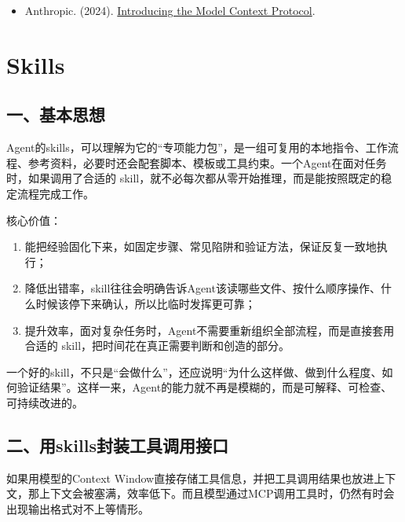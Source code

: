 \begin{itemize}
\tightlist
\item
  Anthropic. (2024). \href{https://www.anthropic.com/news/model-context-protocol}{Introducing the Model Context Protocol}.
\end{itemize}

\clearpage

\hypertarget{skills}{%
\section{Skills}\label{skills}}

\hypertarget{ux4e00ux57faux672cux601dux60f3-2}{%
\subsection{一、基本思想}\label{ux4e00ux57faux672cux601dux60f3-2}}

Agent的skills，可以理解为它的``专项能力包''，是一组可复用的本地指令、工作流程、参考资料，必要时还会配套脚本、模板或工具约束。一个Agent在面对任务时，如果调用了合适的 skill，就不必每次都从零开始推理，而是能按照既定的稳定流程完成工作。

核心价值：

\begin{enumerate}
\def\labelenumi{\arabic{enumi}.}
\item
  能把经验固化下来，如固定步骤、常见陷阱和验证方法，保证反复一致地执行；
\item
  降低出错率，skill往往会明确告诉Agent该读哪些文件、按什么顺序操作、什么时候该停下来确认，所以比临时发挥更可靠；
\item
  提升效率，面对复杂任务时，Agent不需要重新组织全部流程，而是直接套用合适的 skill，把时间花在真正需要判断和创造的部分。
\end{enumerate}

一个好的skill，不只是``会做什么''，还应说明``为什么这样做、做到什么程度、如何验证结果''。这样一来，Agent的能力就不再是模糊的，而是可解释、可检查、可持续改进的。

\hypertarget{ux4e8cux7528skillsux5c01ux88c5ux5de5ux5177ux8c03ux7528ux63a5ux53e3}{%
\subsection{二、用skills封装工具调用接口}\label{ux4e8cux7528skillsux5c01ux88c5ux5de5ux5177ux8c03ux7528ux63a5ux53e3}}

如果用模型的Context Window直接存储工具信息，并把工具调用结果也放进上下文，那上下文会被塞满，效率低下。而且模型通过MCP调用工具时，仍然有时会出现输出格式对不上等情形。


